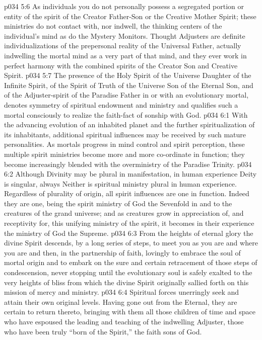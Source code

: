 \pc \vs p034 5:6 As individuals you do not personally possess a segregated portion or entity of the spirit of the Creator Father\hyp{}Son or the Creative Mother Spirit; these ministries do not contact with, nor indwell, the thinking centers of the individual’s mind as do the Mystery Monitors. Thought Adjusters are definite individualizations of the prepersonal reality of the Universal Father, actually indwelling the mortal mind as a very part of that mind, and they ever work in perfect harmony with the combined spirits of the Creator Son and Creative Spirit.
\vs p034 5:7 The presence of the Holy Spirit of the Universe Daughter of the Infinite Spirit, of the Spirit of Truth of the Universe Son of the Eternal Son, and of the Adjuster\hyp{}spirit of the Paradise Father in or with an evolutionary mortal, denotes symmetry of spiritual endowment and ministry and qualifies such a mortal consciously to realize the faith\hyp{}fact of sonship with God.
\vs p034 6:1 With the advancing evolution of an inhabited planet and the further spiritualization of its inhabitants, additional spiritual influences may be received by such mature personalities. As mortals progress in mind control and spirit perception, these multiple spirit ministries become more and more co\hyp{}ordinate in function; they become increasingly blended with the overministry of the Paradise Trinity.
\vs p034 6:2 Although Divinity may be plural in manifestation, in human experience Deity is singular, always  Neither is spiritual ministry plural in human experience. Regardless of plurality of origin, all spirit influences are one in function. Indeed they are one, being the spirit ministry of God the Sevenfold in and to the creatures of the grand universe; and as creatures grow in appreciation of, and receptivity for, this unifying ministry of the spirit, it becomes in their experience the ministry of God the Supreme.
\pc \vs p034 6:3 From the heights of eternal glory the divine Spirit descends, by a long series of steps, to meet you as you are and where you are and then, in the partnership of faith, lovingly to embrace the soul of mortal origin and to embark on the sure and certain retracement of those steps of condescension, never stopping until the evolutionary soul is safely exalted to the very heights of bliss from which the divine Spirit originally sallied forth on this mission of mercy and ministry.
\vs p034 6:4 Spiritual forces unerringly seek and attain their own original levels. Having gone out from the Eternal, they are certain to return thereto, bringing with them all those children of time and space who have espoused the leading and teaching of the indwelling Adjuster, those who have been truly “born of the Spirit,” the faith sons of God.
